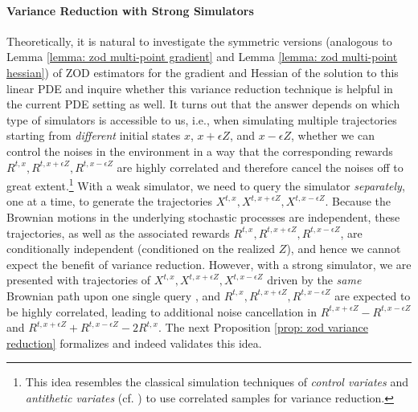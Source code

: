 \documentclass[twoside,11pt]{article}
\newcommand{\1}{\mathbf{1}}
\numberwithin{equation}{section}
\begin{document}
\paragraph{Variance Reduction with Strong Simulators}
Theoretically, it is natural to investigate the symmetric versions (analogous to Lemma \ref{lemma: zod multi-point gradient} and Lemma \ref{lemma: zod multi-point hessian}) of ZOD estimators for the gradient and Hessian of the solution to this linear PDE and inquire whether  this variance reduction technique is helpful in the current PDE setting as well. It turns out that the answer depends on which type of simulators is accessible to us, i.e., when simulating multiple  trajectories starting from {\it different} initial states $x$, $x+\epsilon Z$, and $x-\epsilon Z$, whether we can control the noises in the environment in a way that the corresponding rewards $R^{t,x},R^{t,x+\epsilon Z},R^{t,x-\epsilon Z}$ are highly correlated and therefore cancel the noises off to great extent.\footnote{This idea resembles the classical simulation techniques of \textit{control variates} and \textit{antithetic variates} (cf. \citealt[Chapter 4]{glasserman2004monte}) to use correlated samples for variance  reduction. } With a weak simulator, we need to query the simulator {\it separately}, one at a time,  to generate the trajectories $X^{t,x},X^{t,x+\epsilon Z},X^{t,x-\epsilon Z}$. Because the Brownian motions in the underlying stochastic processes are independent, these trajectories, as well as the associated rewards $R^{t,x},R^{t,x+\epsilon Z},R^{t,x-\epsilon Z}$, are conditionally independent (conditioned on the realized $Z$), and hence we cannot expect the benefit of variance reduction. However, with a strong simulator, we are presented with trajectories of $X^{t,x},X^{t,x+\epsilon Z},X^{t,x-\epsilon Z}$ driven by the {\it same} Brownian path upon one single query , and $R^{t,x},R^{t,x+\epsilon Z},R^{t,x-\epsilon Z}$ are expected to be highly correlated, leading to additional noise cancellation in $R^{t,x+\epsilon Z}-R^{t,x-\epsilon Z}$ and $R^{t,x+\epsilon Z}+R^{t,x-\epsilon Z}-2R^{t,x}$. The next Proposition \ref{prop: zod variance reduction} formalizes and indeed validates this idea.
\end{document}

